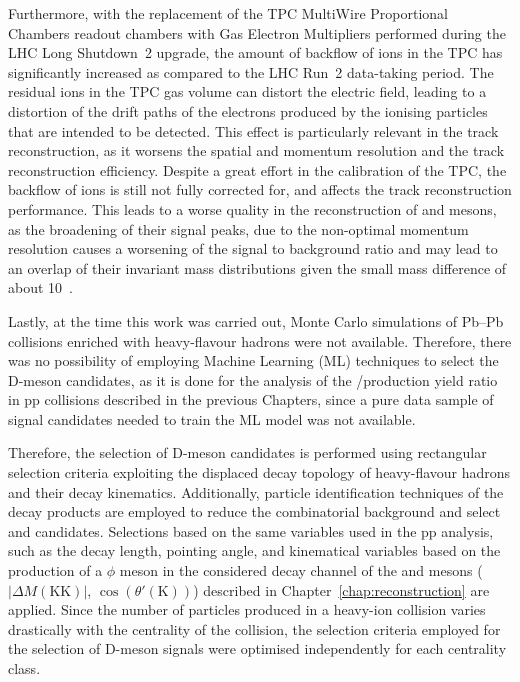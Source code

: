 Furthermore, with the replacement of the TPC MultiWire Proportional Chambers readout chambers with Gas Electron Multipliers performed during the LHC Long Shutdown~2 upgrade, the amount of backflow of ions in the TPC has significantly increased as compared to the LHC Run~2 data-taking period. The residual ions in the TPC gas volume can distort the electric field, leading to a distortion of the drift paths of the electrons produced by the ionising particles that are intended to be detected. This effect is particularly relevant in the track reconstruction, as it worsens the spatial and momentum resolution and the track reconstruction efficiency. Despite a great effort in the calibration of the TPC, the backflow of ions is still not fully corrected for, and affects the track reconstruction performance. This leads to a worse quality in the reconstruction of  \ds and \dpl mesons, as the broadening of their signal peaks, due to the non-optimal momentum resolution causes a worsening of the signal to background ratio and may lead to an overlap of their invariant mass distributions given the small mass difference of about 10~\mevcc.


Lastly, at the time this work was carried out, Monte Carlo simulations of Pb--Pb collisions enriched with heavy-flavour hadrons were not available. Therefore, there was no possibility of employing Machine Learning (ML) techniques to select the D-meson candidates, as it is done for the analysis of the \ds/\dpl production yield ratio in pp collisions described in the previous Chapters, since a pure data sample of signal candidates needed to train the ML model was not available. 

Therefore, the selection of D-meson candidates is performed using rectangular selection criteria exploiting the displaced decay topology of heavy-flavour hadrons and their decay kinematics. Additionally, particle identification techniques of the decay products are employed to reduce the combinatorial background and select \ds and \dpl candidates. Selections based on the same variables used in the pp analysis, such as the decay length, pointing angle, and kinematical variables based on the production of a $\phi$ meson in the considered decay channel of the \ds and \dpl mesons ($\lvert\Delta M(\mathrm{KK})\rvert$, $\cos\left(\theta'(\mathrm K)\right)$) described in Chapter~\ref{chap:reconstruction} are applied. Since the number of particles produced in a heavy-ion collision varies drastically with the centrality of the collision, the selection criteria employed for the selection of D-meson signals were optimised independently for each centrality class.

